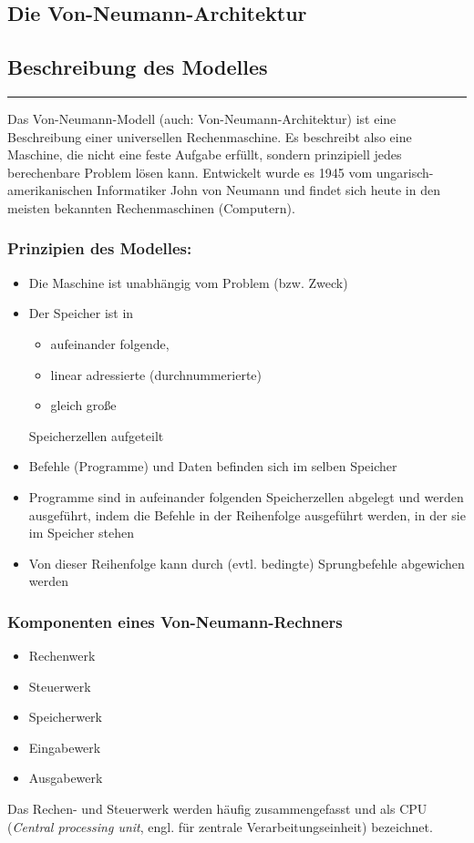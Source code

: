 \documentclass[a4paper,12pt]{article}
\begin{document}
\begin{center}
\section*{Die Von-Neumann-Architektur}
\subsection*{Beschreibung des Modelles}
\end{center}

\hrule
\vspace{.5cm}

Das Von-Neumann-Modell (auch: Von-Neumann-Architektur) ist eine Beschreibung einer universellen Rechenmaschine. Es beschreibt also eine Maschine, die nicht eine feste Aufgabe erfüllt, sondern prinzipiell jedes berechenbare Problem lösen kann. Entwickelt wurde es 1945 vom ungarisch-amerikanischen Informatiker John von Neumann und findet sich heute in den meisten bekannten Rechenmaschinen (Computern).\\

\subsubsection*{Prinzipien des Modelles:}
\begin{itemize}
\item Die Maschine ist unabhängig vom Problem (bzw. Zweck)
\item Der Speicher ist in
	\begin{itemize}
	\item aufeinander folgende,
	\item linear adressierte (durchnummerierte)
	\item gleich große
	\end{itemize}
	Speicherzellen aufgeteilt
\item Befehle (Programme) und Daten befinden sich im selben Speicher
\item Programme sind in aufeinander folgenden Speicherzellen abgelegt und werden ausgeführt, indem die Befehle in der Reihenfolge ausgeführt werden, in der sie im Speicher stehen
\item Von dieser Reihenfolge kann durch (evtl. bedingte) Sprungbefehle abgewichen werden
\end{itemize}

\subsubsection*{Komponenten eines Von-Neumann-Rechners}
\begin{itemize}
\item Rechenwerk
\item Steuerwerk
\item Speicherwerk
\item Eingabewerk
\item Ausgabewerk
\end{itemize}
Das Rechen- und Steuerwerk werden häufig zusammengefasst und als CPU (\emph{Central processing unit}, engl. für zentrale Verarbeitungseinheit) bezeichnet.
\end{document}
